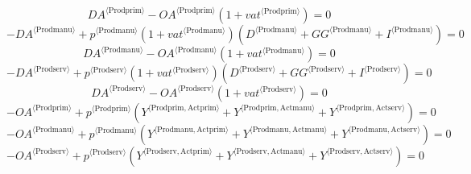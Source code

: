 \begin{equation}
{{D\!A}}^{\langle \mathrm{Prodprim}\rangle} - {{{O\!A}}^{\langle \mathrm{Prodprim}\rangle}} \left(1 + {{v\!a\!t}}^{\langle \mathrm{\mathrm{Prodprim}}\rangle}\right) = 0
\end{equation}
\begin{equation}
-{{D\!A}}^{\langle \mathrm{Prodmanu}\rangle} + {{p}^{\langle \mathrm{Prodmanu}\rangle}} \left(1 + {{v\!a\!t}}^{\langle \mathrm{\mathrm{Prodmanu}}\rangle}\right) \left({D}^{\langle \mathrm{Prodmanu}\rangle} + {{G\!G}}^{\langle \mathrm{Prodmanu}\rangle} + {I}^{\langle \mathrm{Prodmanu}\rangle}\right) = 0
\end{equation}
\begin{equation}
{{D\!A}}^{\langle \mathrm{Prodmanu}\rangle} - {{{O\!A}}^{\langle \mathrm{Prodmanu}\rangle}} \left(1 + {{v\!a\!t}}^{\langle \mathrm{\mathrm{Prodmanu}}\rangle}\right) = 0
\end{equation}
\begin{equation}
-{{D\!A}}^{\langle \mathrm{Prodserv}\rangle} + {{p}^{\langle \mathrm{Prodserv}\rangle}} \left(1 + {{v\!a\!t}}^{\langle \mathrm{\mathrm{Prodserv}}\rangle}\right) \left({D}^{\langle \mathrm{Prodserv}\rangle} + {{G\!G}}^{\langle \mathrm{Prodserv}\rangle} + {I}^{\langle \mathrm{Prodserv}\rangle}\right) = 0
\end{equation}
\begin{equation}
{{D\!A}}^{\langle \mathrm{Prodserv}\rangle} - {{{O\!A}}^{\langle \mathrm{Prodserv}\rangle}} \left(1 + {{v\!a\!t}}^{\langle \mathrm{\mathrm{Prodserv}}\rangle}\right) = 0
\end{equation}
\begin{equation}
-{{O\!A}}^{\langle \mathrm{Prodprim}\rangle} + {{p}^{\langle \mathrm{Prodprim}\rangle}} \left({Y}^{\langle \mathrm{Prodprim},\mathrm{Actprim}\rangle} + {Y}^{\langle \mathrm{Prodprim},\mathrm{Actmanu}\rangle} + {Y}^{\langle \mathrm{Prodprim},\mathrm{Actserv}\rangle}\right) = 0
\end{equation}
\begin{equation}
-{{O\!A}}^{\langle \mathrm{Prodmanu}\rangle} + {{p}^{\langle \mathrm{Prodmanu}\rangle}} \left({Y}^{\langle \mathrm{Prodmanu},\mathrm{Actprim}\rangle} + {Y}^{\langle \mathrm{Prodmanu},\mathrm{Actmanu}\rangle} + {Y}^{\langle \mathrm{Prodmanu},\mathrm{Actserv}\rangle}\right) = 0
\end{equation}
\begin{equation}
-{{O\!A}}^{\langle \mathrm{Prodserv}\rangle} + {{p}^{\langle \mathrm{Prodserv}\rangle}} \left({Y}^{\langle \mathrm{Prodserv},\mathrm{Actprim}\rangle} + {Y}^{\langle \mathrm{Prodserv},\mathrm{Actmanu}\rangle} + {Y}^{\langle \mathrm{Prodserv},\mathrm{Actserv}\rangle}\right) = 0
\end{equation}
